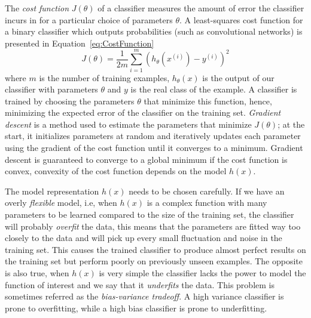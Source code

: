 The \emph{cost function} $J(\theta)$ of a classifier measures the amount of error the classifier incurs in for a particular choice of parameters $\theta$. A least-squares cost function for a binary classifier which outputs probabilities (such as convolutional networks) is presented in Equation~\ref{eq:CostFunction} 
\begin{equation}
	J(\theta) = \frac{1}{2m}\sum_{i=1}^m(h_\theta(x^{(i)}) - y^{(i)})^2
	\label{eq:CostFunction}
\end{equation}
where $m$ is the number of training examples, $h_\theta(x)$ is the output of our classifier with parameters $\theta$ and $y$ is the real class of the example. A classifier is trained by choosing the parameters $\theta$ that minimize this function, hence, minimizing the expected error of the classifier on the training set. \emph{Gradient descent} is a method used to estimate the parameters that minimize $J(\theta)$; at the start, it initializes parameters at random and iteratively updates each parameter using the gradient of the cost function until it converges to a minimum. Gradient descent is guaranteed to converge to a global minimum if the cost function is convex, convexity of the cost function depends on the model $h(x)$.

The model representation $h(x)$ needs to be chosen carefully. If we have an overly \emph{flexible} model, i.e, when $h(x)$ is a complex function with many parameters to be learned compared to the size of the training set, the classifier will probably \emph{overfit} the data, this means that the parameters are fitted way too closely to the data and will pick up every small fluctuation and noise in the training set. This causes the trained classifier to produce almost perfect results on the training set but perform poorly on previously unseen examples. The opposite is also true, when $h(x)$ is very simple the classifier lacks the power to model the function of interest and we say that it \emph{underfits} the data. This problem is sometimes referred as the \emph{bias-variance tradeoff}. A high variance classifier is prone to overfitting, while a high bias classifier is prone to underfitting.

